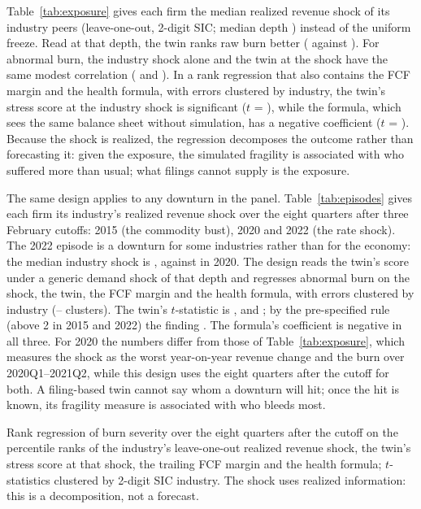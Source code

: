\documentclass[11pt]{article}
\begin{document}
Table~\ref{tab:exposure} gives each firm the median realized revenue shock of its industry peers (leave-one-out, 2-digit SIC; median depth \ExpDepth) instead of the uniform freeze. Read at that depth, the twin ranks raw burn better (\ExpTwinRaw{} against \ExpUniformRaw). For abnormal burn, the industry shock alone and the twin at the shock have the same modest correlation (\ExpOnlyAbn{} and \ExpTwinAbn). In a rank regression that also contains the FCF margin and the health formula, with errors clustered by industry, the twin's stress score at the industry shock is significant ($t$ = \ExpTwinAbnT), while the formula, which sees the same balance sheet without simulation, has a negative coefficient ($t$ = \ExpFormulaAbnT). Because the shock is realized, the regression decomposes the outcome rather than forecasting it: given the exposure, the simulated fragility is associated with who suffered more than usual; what filings cannot supply is the exposure.

The same design applies to any downturn in the panel. Table~\ref{tab:episodes} gives each firm its industry's realized
revenue shock over the eight quarters after three February cutoffs: 2015 (the commodity bust), 2020 and 2022 (the rate
shock). The 2022 episode is a downturn for some industries rather than for the economy: the median industry shock is \EpiTwentyTwoDepth, against \EpiTwentyDepth{} in 2020. The design reads the twin's score under a generic demand shock of that depth and regresses abnormal burn on the shock,
the twin, the FCF margin and the health formula, with errors clustered by industry (\EpiFifteenClusters--\EpiTwentyTwoClusters{} clusters). The twin's $t$-statistic is
\EpiFifteenTRobust, \EpiTwentyTRobust{} and \EpiTwentyTwoTRobust; by the pre-specified rule (above 2 in 2015 and 2022) the finding
\EpiVerdict. The formula's coefficient is negative in all three. For 2020 the numbers differ from those of Table~\ref{tab:exposure}, which measures the shock as the worst year-on-year revenue change and the burn over 2020Q1--2021Q2, while this design uses the eight quarters after the cutoff for both. A filing-based twin cannot say whom a downturn will hit; once the hit is known, its fragility measure is associated with who bleeds most.

\begin{table}[t]
\centering\scriptsize
\caption{Fragility given exposure in three downturns}
\label{tab:episodes}

\par\smallskip
\begin{minipage}{\linewidth}\footnotesize
Rank regression of burn severity over the eight quarters after the cutoff on the percentile ranks of the industry's
leave-one-out realized revenue shock, the twin's stress score at that shock, the trailing FCF margin and the health
formula; $t$-statistics clustered by 2-digit SIC industry. The shock uses realized information: this is a decomposition, not a forecast.
\end{minipage}
\end{table}
\end{document}
